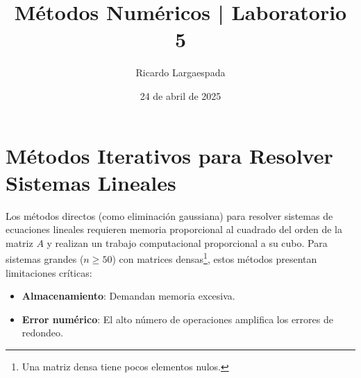 \documentclass[12pt,letterpaper]{article}
\author{Ricardo Largaespada}
\title{\textbf{Métodos Numéricos | Laboratorio 5}}
\date{24 de abril de 2025}
\theoremstyle{definition}
\theoremstyle{plain}
\theoremstyle{remark}
\begin{document}
\maketitle


\section{Métodos Iterativos para Resolver Sistemas Lineales}

Los métodos directos (como eliminación gaussiana) para resolver sistemas de ecuaciones lineales requieren memoria proporcional al cuadrado del orden de la matriz $A$ y realizan un trabajo computacional proporcional a su cubo. Para sistemas grandes ($n \geq 50$) con matrices densas\footnote{Una matriz densa tiene pocos elementos nulos.}, estos métodos presentan limitaciones críticas:

\begin{itemize}
    \item \textbf{Almacenamiento}: Demandan memoria excesiva.
    \item \textbf{Error numérico}: El alto número de operaciones amplifica los errores de redondeo.
\end{itemize}
\end{document}
